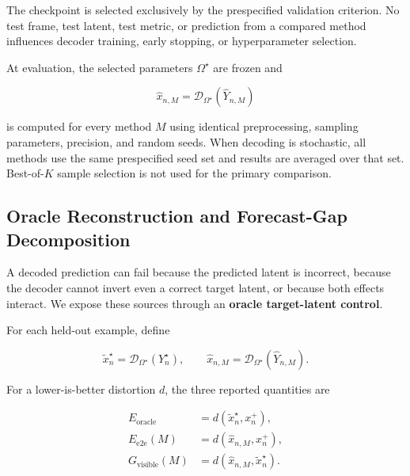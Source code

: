 The checkpoint is selected exclusively by the prespecified validation
criterion. No test frame, test latent, test metric, or prediction from
a compared method influences decoder training, early stopping, or
hyperparameter selection.

At evaluation, the selected parameters \(\Omega^\star\) are frozen and

\begin{equation*}
\widehat x_{n,M}
=
\mathcal D_{\Omega^\star}
\left(
\widehat Y_{n,M}
\right)
\end{equation*}

is computed for every method \(M\) using identical preprocessing,
sampling parameters, precision, and random seeds. When decoding is
stochastic, all methods use the same prespecified seed set and results
are averaged over that set. Best-of-\(K\) sample selection is not used
for the primary comparison.


\subsection{Oracle Reconstruction and Forecast-Gap Decomposition}
\label{app:rgb_oracle}

A decoded prediction can fail because the predicted latent is
incorrect, because the decoder cannot invert even a correct target
latent, or because both effects interact. We expose these sources
through an \textbf{oracle target-latent control}.

For each held-out example, define

\begin{equation*}
\widetilde x_n^\star
=
\mathcal D_{\Omega^\star}(Y_n^\star),
\qquad
\widehat x_{n,M}
=
\mathcal D_{\Omega^\star}(\widehat Y_{n,M}).
\end{equation*}

For a lower-is-better distortion \(d\), the three reported quantities
are

\begin{equation*}
\begin{aligned}
E_{\mathrm{oracle}}
&=
d(\widetilde x_n^\star,x_n^+),                                   \\
E_{\mathrm{e2e}}(M)
&=
d(\widehat x_{n,M},x_n^+),                                       \\
G_{\mathrm{visible}}(M)
&=
d(\widehat x_{n,M},\widetilde x_n^\star).
\end{aligned}
\end{equation*}

